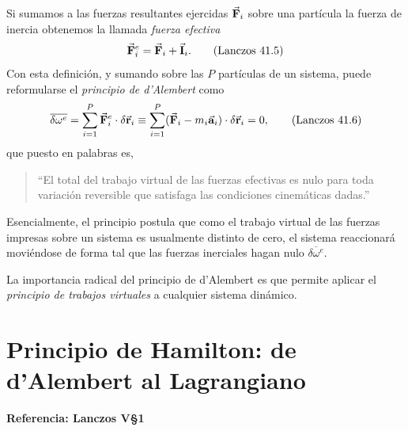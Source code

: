 \documentclass[12pt, spanish, a4paper, ]{article}
\begin{document}
Si sumamos a las fuerzas resultantes ejercidas \(\va{F}_i\) sobre una partícula la fuerza de inercia obtenemos la llamada \emph{fuerza efectiva}
\begin{equation}\label{Lanczos41.5}
	\va{F}^e_i= \va{F}_i + \va{I}_i.
	\tag{Lanczos 41.5}
\end{equation}
Con esta definición, y sumando sobre las \(P\) partículas de un sistema, puede reformularse el \emph{principio de d'Alembert} como 
\begin{equation}\label{Lanczos41.6}
	\overline {\delta \omega^e} = 
	\displaystyle\sum_{i=1}^P \va{F}^e_i \cdot \delta \va{r}_i \equiv 
	\displaystyle\sum_{i=1}^P (\va{F}_i - m_i \va{a}_i) \cdot \delta \va{r}_i = 0, 
	\tag{Lanczos 41.6}
\end{equation}
que puesto en palabras es,
\begin{quote}
	``El total del trabajo virtual de las fuerzas efectivas es nulo para toda variación reversible que satisfaga las condiciones cinemáticas dadas.''
\end{quote}
Esencialmente, el principio postula que como el trabajo virtual de las fuerzas impresas sobre un sistema es usualmente distinto de cero, el sistema reaccionará moviéndose de forma tal que las fuerzas inerciales hagan nulo \(\overline {\delta \omega^e}\).

La importancia radical del principio de d'Alembert es que permite aplicar el \emph{principio de trabajos virtuales} a cualquier sistema dinámico.


\section{Principio de Hamilton: de d'Alembert al Lagrangiano}\label{principioHamilton}
\textbf{Referencia: Lanczos V\S1}\\
 
\end{document}
